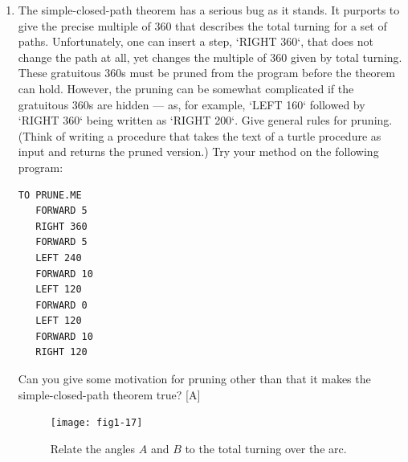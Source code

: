 \documentclass{book}
\begin{document}
\begin{enumerate}
\item The simple-closed-path theorem has a serious bug as it stands. It purports to give the precise multiple of 360 that describes the total turning
for a set of paths. Unfortunately, one can insert a step, \textsc{`RIGHT 360`},
that does not change the path at all, yet changes the multiple of 360
given by total turning. These gratuitous 360s must be pruned from
the program before the theorem can hold. However, the pruning can
be somewhat complicated if the gratuitous 360s are hidden --- as, for example, \textsc{`LEFT 160`} followed by \textsc{`RIGHT 360`} being written as \textsc{`RIGHT 200`}.
Give general rules for pruning. (Think of writing a procedure that takes
the text of a turtle procedure as input and returns the pruned version.)
Try your method on the following program:

\begin{verbatim}
TO PRUNE.ME
   FORWARD 5
   RIGHT 360
   FORWARD 5
   LEFT 240
   FORWARD 10
   LEFT 120
   FORWARD 0
   LEFT 120
   FORWARD 10
   RIGHT 120
\end{verbatim}
Can you give some motivation for pruning other than that it makes the
simple-closed-path theorem true? [A]


\begin{figure}
\begin{center}
\texttt{[image: fig1-17]}
\caption{Relate the angles $A$ and $B$ to the total turning over the arc.}
\end{center}
\end{figure}



\end{enumerate}
\end{document}
